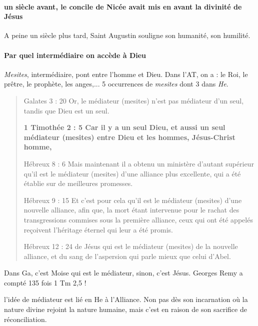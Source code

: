   \paragraph{un siècle avant, le concile de Nicée avait mis en avant la divinité de Jésus} A peine un siècle plus tard, Saint Augustin souligne son humanité, son humilité. 
  
  \paragraph{Par quel intermédiaire on accède à Dieu} \emph{Mesites}, intermédiaire, pont entre l'homme et Dieu. Dans l'AT, on a : le Roi, le prêtre, le prophète, les anges,... 5 occurrences de \emph{mesites} dont 3 dans \textit{He}.  
\begin{quote}
    Galates 3 : 20		Or, le médiateur (mesites) n'est pas médiateur d'un seul, tandis que Dieu est un seul.

\textbf{1 Timothée 2 : 5		Car il y a un seul Dieu, et aussi un seul médiateur (mesites) entre Dieu et les hommes, Jésus-Christ homme,}

Hébreux 8 : 6		Mais maintenant il a obtenu un ministère d'autant supérieur qu'il est le médiateur (mesites) d'une alliance plus excellente, qui a été établie sur de meilleures promesses.

Hébreux 9 : 15		Et c'est pour cela qu'il est le médiateur (mesites) d'une nouvelle alliance, afin que, la mort étant intervenue pour le rachat des transgressions commises sous la première alliance, ceux qui ont été appelés reçoivent l'héritage éternel qui leur a été promis.

Hébreux 12 : 24		de Jésus qui est le médiateur (mesites) de la nouvelle alliance, et du sang de l'aspersion qui parle mieux que celui d'Abel.
\end{quote}
Dans Ga, c'est Moise qui est le médiateur, sinon, c'est Jésus. Georges Remy a compté 135 fois 1 Tm 2,5 ! 
\begin{Synthesis}
l'idée de médiateur est lié en He à l'Alliance. Non pas dès son incarnation où la nature divine rejoint la nature humaine, mais c'est en raison de son sacrifice de réconciliation. 
\end{Synthesis}
  

